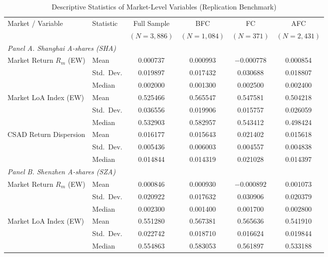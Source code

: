 \documentclass[12pt, a4paper]{article}
\begin{document}
\begin{table}[H]
  \centering
  \caption{Descriptive Statistics of Market-Level Variables (Replication Benchmark)}
  \label{tab:desc_stats}
  \begin{threeparttable}
  \begin{tabular}{llcccc}
    \toprule
    \multirow{2}{*}{Market / Variable} & \multirow{2}{*}{Statistic} & Full Sample & BFC & FC & AFC \\
    & & $(N=3{,}886)$ & $(N=1{,}084)$ & $(N=371)$ & $(N=2{,}431)$ \\
    \midrule
    \multicolumn{6}{l}{\textit{Panel A. Shanghai A-shares (SHA)}} \\[2pt]
    \multirow{3}{*}{Market Return $R_m$ (EW)}
      & Mean      & 0.000737 & 0.000993 & $-0.000778$ & 0.000854 \\
      & Std.\ Dev.& 0.019897 & 0.017432 & 0.030688    & 0.018807 \\
      & Median    & 0.002000 & 0.001300 & 0.002500    & 0.002400 \\[4pt]
    \multirow{3}{*}{Market LoA Index (EW)}
      & Mean      & 0.525466 & 0.565547 & 0.547581 & 0.504218 \\
      & Std.\ Dev.& 0.036556 & 0.019906 & 0.015757 & 0.026059 \\
      & Median    & 0.532903 & 0.582957 & 0.543412 & 0.498424 \\[4pt]
    \multirow{3}{*}{CSAD Return Dispersion}
      & Mean      & 0.016177 & 0.015643 & 0.021402 & 0.015618 \\
      & Std.\ Dev.& 0.005436 & 0.006003 & 0.004557 & 0.004838 \\
      & Median    & 0.014844 & 0.014319 & 0.021028 & 0.014397 \\[6pt]
    \multicolumn{6}{l}{\textit{Panel B. Shenzhen A-shares (SZA)}} \\[2pt]
    \multirow{3}{*}{Market Return $R_m$ (EW)}
      & Mean      & 0.000846 & 0.000930 & $-0.000892$ & 0.001073 \\
      & Std.\ Dev.& 0.020922 & 0.017632 & 0.030906    & 0.020379 \\
      & Median    & 0.002300 & 0.001400 & 0.001700    & 0.002800 \\[4pt]
    \multirow{3}{*}{Market LoA Index (EW)}
      & Mean      & 0.551280 & 0.567381 & 0.565636 & 0.541910 \\
      & Std.\ Dev.& 0.022742 & 0.018710 & 0.016624 & 0.019844 \\
      & Median    & 0.554863 & 0.583053 & 0.561897 & 0.533188 \\[4pt]

\end{tabular}
\end{threeparttable}
\end{table}
\end{document}
